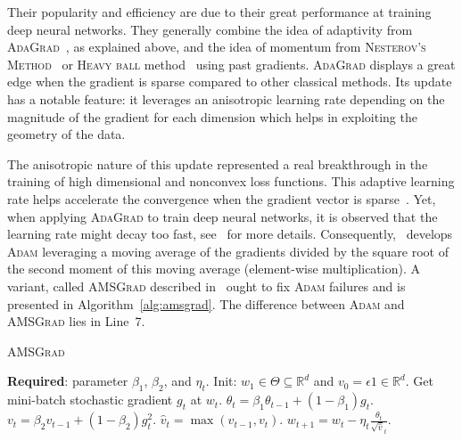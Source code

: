 \documentclass{article}
\begin{document}
Their popularity and efficiency are due to their great performance at training deep neural networks.
They generally combine the idea of adaptivity from \textsc{AdaGrad}~\citep{DHS11,MS10}, as explained above, and the idea of momentum from \textsc{Nesterov's Method}~\citep{N04} or \textsc{Heavy ball} method~\citep{P64} using past gradients.
\textsc{AdaGrad} displays a great edge when the gradient is sparse compared to other classical methods.
Its update has a notable feature: it leverages an anisotropic learning rate depending on the magnitude of the gradient for each dimension which helps in exploiting the geometry of the data. 

The anisotropic nature of this update represented a real breakthrough in the training of high dimensional and nonconvex loss functions.
This adaptive learning rate helps accelerate the convergence when the gradient vector is sparse~\citep{DHS11}. Yet, when applying \textsc{AdaGrad} to train deep neural networks, it is observed that the learning rate might decay too fast, see~\citet{KB15} for more details.
Consequently,~\citet{KB15} develops \textsc{Adam} leveraging a moving average of the gradients divided by the square root of the second moment of this moving average (element-wise multiplication).
A variant, called \textsc{AMSGrad} described in~\citet{RKK18} ought to fix \textsc{Adam} failures and is presented in Algorithm~\ref{alg:amsgrad}. The difference between \textsc{Adam} and \textsc{AMSGrad} lies in Line~7.

\begin{algorithm}[H]
\caption{\textsc{AMSGrad}~\citep{RKK18}} \label{alg:amsgrad}
\begin{algorithmic}[1]
\small
\STATE \textbf{Required}: parameter $\beta_1$, $\beta_2$, and $\eta_t$. 
\STATE Init: $w_{1} \in \Theta \subseteq \mathbb R^d $ and $v_{0} = \epsilon 1 \in \mathbb R^{d}$.
\STATE Get mini-batch stochastic gradient $g_t$ at $w_t$.
\STATE $\theta_t = \beta_1 \theta_{t-1} + (1 - \beta_1) g_t$.
\STATE $v_t = \beta_2 v_{t-1} + (1 - \beta_2) g_t^2$. 
\STATE \label{line:maxop}$\hat{v}_t = \max( \hat{v}_{t-1} , v_t )$. 
\STATE $w_{t+1} = w_t - \eta_t \frac{\theta_t}{ \sqrt{\hat{v}}_t }$.
\ENDFOR
\end{algorithmic}
\end{algorithm}\vspace{-0.1in}
\end{document}
